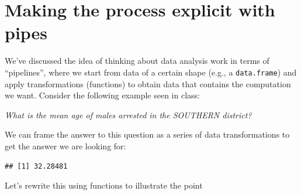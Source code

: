 \documentclass[12pt,]{book}
\newenvironment{Shaded}{\begin{snugshade}}{\end{snugshade}}
\newcommand{\KeywordTok}[1]{\textcolor[rgb]{0.13,0.29,0.53}{\textbf{#1}}}
\newcommand{\DataTypeTok}[1]{\textcolor[rgb]{0.13,0.29,0.53}{#1}}
\newcommand{\StringTok}[1]{\textcolor[rgb]{0.31,0.60,0.02}{#1}}
\newcommand{\CommentTok}[1]{\textcolor[rgb]{0.56,0.35,0.01}{\textit{#1}}}
\newcommand{\OtherTok}[1]{\textcolor[rgb]{0.56,0.35,0.01}{#1}}
\newcommand{\ControlFlowTok}[1]{\textcolor[rgb]{0.13,0.29,0.53}{\textbf{#1}}}
\newcommand{\OperatorTok}[1]{\textcolor[rgb]{0.81,0.36,0.00}{\textbf{#1}}}
\newcommand{\NormalTok}[1]{#1}
\theoremstyle{definition}
\theoremstyle{definition}
\theoremstyle{remark}
\begin{document}
\section{Making the process explicit with
pipes}\label{making-the-process-explicit-with-pipes}

We've discussed the idea of thinking about data analysis work in terms
of ``pipelines'', where we start from data of a certain shape (e.g., a
\texttt{data.frame}) and apply transformations (functions) to obtain
data that contains the computation we want. Consider the following
example seen in class:

\emph{What is the mean age of males arrested in the SOUTHERN district?}

We can frame the answer to this question as a series of data
transformations to get the answer we are looking for:

\begin{Shaded}
\end{Shaded}

\begin{verbatim}
## [1] 32.28481
\end{verbatim}

Let's rewrite this using functions to illustrate the point

\begin{Shaded}
\end{Shaded}
\end{document}
